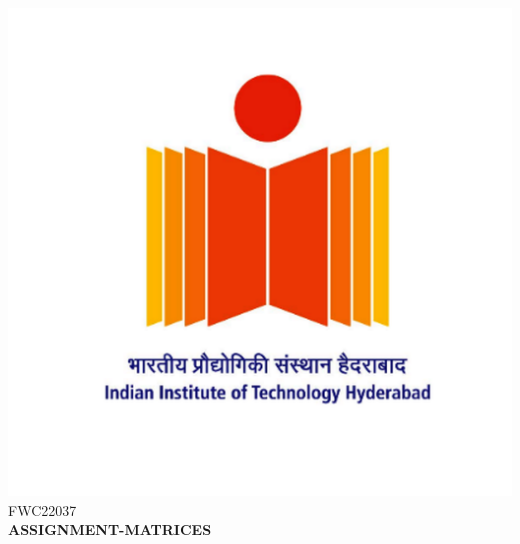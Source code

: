 \documentclass[a4paper,10pt]{report}
\begin{document}
\raggedright{\includegraphics[scale=0.03]{logo.png}}\hspace{12.425cm}\raggedleft FWC22037\vspace{2mm}\\
\centering\Large\textbf{ASSIGNMENT-MATRICES}\vspace{5mm}
\end{document}
